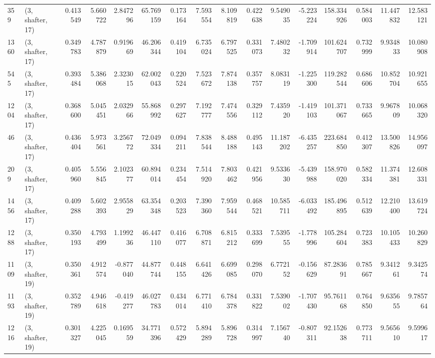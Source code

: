 \begin{tabular}{llrrrrrrrrrrrrrr}
359  &  (3, shafter, 17) &   0.413549 &   5.660722 &   2.847296 &     65.769159 &    0.173164 &    7.593554 &    8.109819 &  0.422638 &   9.549035 &  -5.223224 &   158.334926 &   0.584003 &  11.447832 &  12.583121 \\
1360 &  (3, shafter, 17) &   0.349783 &   4.787879 &   0.919669 &     46.206344 &    0.419104 &    6.735024 &    6.797525 &  0.331073 &   7.480232 &  -1.709914 &   101.624707 &   0.732999 &   9.934833 &  10.080908 \\
545  &  (3, shafter, 17) &   0.393484 &   5.386068 &   2.323015 &     62.002043 &    0.220524 &    7.523672 &    7.874138 &  0.357757 &   8.083119 &  -1.225300 &   119.282544 &   0.686606 &  10.852704 &  10.921655 \\
1204 &  (3, shafter, 17) &   0.368600 &   5.045451 &   2.032966 &     55.868992 &    0.297627 &    7.192777 &    7.474556 &  0.329112 &   7.435920 &  -1.419103 &   101.371067 &   0.733665 &   9.967809 &  10.068320 \\
46   &  (3, shafter, 17) &   0.436404 &   5.973561 &   3.256772 &     72.049334 &    0.094211 &    7.838544 &    8.488188 &  0.495143 &  11.187202 &  -6.435257 &   223.684850 &   0.412307 &  13.500826 &  14.956097 \\
209  &  (3, shafter, 17) &   0.405960 &   5.556845 &   2.102377 &     60.894014 &    0.234454 &    7.514920 &    7.803462 &  0.421956 &   9.533630 &  -5.439988 &   158.970020 &   0.582334 &  11.374381 &  12.608331 \\
1456 &  (3, shafter, 17) &   0.409288 &   5.602393 &   2.955829 &     63.354348 &    0.203523 &    7.390360 &    7.959544 &  0.468521 &  10.585711 &  -6.033492 &   185.496895 &   0.512639 &  12.210400 &  13.619724 \\
1288 &  (3, shafter, 17) &   0.350193 &   4.793499 &   1.199236 &     46.447110 &    0.416077 &    6.708871 &    6.815212 &  0.333699 &   7.539555 &  -1.778996 &   105.284604 &   0.723383 &  10.105433 &  10.260829 \\
1109 &  (3, shafter, 19) &   0.350361 &   4.912574 &  -0.877040 &     44.877744 &    0.448155 &    6.641426 &    6.699085 &  0.298070 &   6.772152 &  -0.156629 &    87.283691 &   0.785667 &   9.341261 &   9.342574 \\
1193 &  (3, shafter, 19) &   0.352789 &   4.946618 &  -0.419277 &     46.027783 &    0.434014 &    6.771410 &    6.784378 &  0.331822 &   7.539002 &  -1.707430 &    95.761168 &   0.764850 &   9.635655 &   9.785764 \\
1216 &  (3, shafter, 19) &   0.301327 &   4.225045 &   0.169559 &     34.771396 &    0.572429 &    5.894289 &    5.896728 &  0.314997 &   7.156740 &  -0.807311 &    92.152638 &   0.773711 &   9.565610 &   9.599617 \\

\end{tabular}
